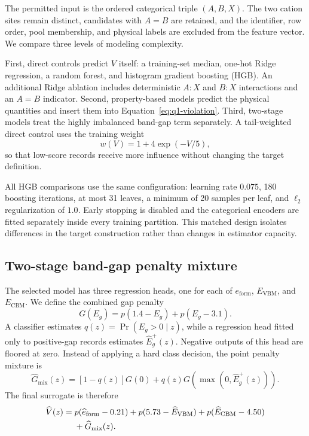 The permitted input is the ordered categorical triple $(A,B,X)$.  The two
cation sites remain distinct, candidates with $A=B$ are retained, and the
identifier, row order, pool membership, and physical labels are excluded
from the feature vector.  We compare three levels of modeling complexity.

First, direct controls predict $V$ itself: a training-set median, one-hot
Ridge regression, a random forest, and histogram gradient boosting (HGB).
An additional Ridge ablation includes deterministic $A{:}X$ and $B{:}X$
interactions and an $A=B$ indicator.  Second, property-based models predict
the physical quantities and insert them into
Equation~\eqref{eq:q1-violation}.  Third, two-stage models treat the highly
imbalanced band-gap term separately.  A tail-weighted direct control uses
the training weight
\begin{equation}
  w(V)=1+4\exp(-V/5),
  \label{eq:q1-tail-weight}
\end{equation}
so that low-score records receive more influence without changing the
target definition.

All HGB comparisons use the same configuration: learning rate $0.075$,
180 boosting iterations, at most 31 leaves, a minimum of 20 samples per
leaf, and $\ell_2$ regularization of $1.0$.  Early stopping is disabled and
the categorical encoders are fitted separately inside every training
partition.  This matched design isolates differences in the target
construction rather than changes in estimator capacity.

\subsection{Two-stage band-gap penalty mixture}

The selected model has three regression heads, one for each of
$e_{\mathrm{form}}$, $E_{\mathrm{VBM}}$, and $E_{\mathrm{CBM}}$.  We define
the combined gap penalty
\begin{equation}
  G(E_g)=p(1.4-E_g)+p(E_g-3.1).
  \label{eq:q1-gap-penalty}
\end{equation}
A classifier estimates
$q(z)=\Pr(E_g>0\mid z)$, while a regression head fitted only to positive-gap
records estimates $\widehat E_g^{+}(z)$.  Negative outputs of this head are
floored at zero.  Instead of applying a hard class decision, the point
penalty mixture is
\begin{equation}
  \widehat G_{\mathrm{mix}}(z)
   =[1-q(z)]G(0)+q(z)G\!\left(\max(0,\widehat E_g^{+}(z))\right).
  \label{eq:q1-gap-mixture}
\end{equation}
The final surrogate is therefore
\begin{align}
  \widehat V(z)={}&p(\widehat e_{\mathrm{form}}-0.21)
  +p(5.73-\widehat E_{\mathrm{VBM}})
  +p(\widehat E_{\mathrm{CBM}}-4.50) \notag\\
  &+\widehat G_{\mathrm{mix}}(z).
  \label{eq:q1-surrogate}
\end{align}

